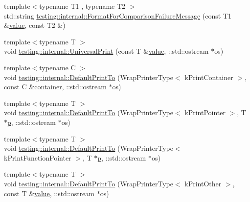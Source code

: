 \begin{DoxyCompactItemize}
\item 
{\footnotesize template$<$typename T1 , typename T2 $>$ }\\std\+::string \mbox{\hyperlink{namespacetesting_1_1internal_a91ab078f10adc669f09b7f604975c518}{testing\+::internal\+::\+Format\+For\+Comparison\+Failure\+Message}} (const T1 \&\mbox{\hyperlink{_obj__test_2lib_2googletest-master_2googlemock_2test_2gmock-matchers__test_8cc_a337b8a670efc0b086ad3af163f3121b6}{value}}, const T2 \&)
\item 
{\footnotesize template$<$typename T $>$ }\\void \mbox{\hyperlink{namespacetesting_1_1internal_a30708fa2bacf11895b03bdb21eb72309}{testing\+::internal\+::\+Universal\+Print}} (const T \&\mbox{\hyperlink{_obj__test_2lib_2googletest-master_2googlemock_2test_2gmock-matchers__test_8cc_a337b8a670efc0b086ad3af163f3121b6}{value}}, \+::std\+::ostream $\ast$os)
\item 
{\footnotesize template$<$typename C $>$ }\\void \mbox{\hyperlink{namespacetesting_1_1internal_a2e96c98d5bd8ee4a1b92f8e3cde7dd40}{testing\+::internal\+::\+Default\+Print\+To}} (Wrap\+Printer\+Type$<$ k\+Print\+Container $>$, const C \&container, \+::std\+::ostream $\ast$os)
\item 
{\footnotesize template$<$typename T $>$ }\\void \mbox{\hyperlink{namespacetesting_1_1internal_a074522dd8d77d61878a042b8d05cc64a}{testing\+::internal\+::\+Default\+Print\+To}} (Wrap\+Printer\+Type$<$ k\+Print\+Pointer $>$, T $\ast$\mbox{\hyperlink{_obj__test_2lib_2googletest-master_2googlemock_2test_2gmock-matchers__test_8cc_a6bc6b007533335efe02bafff799ec64c}{p}}, \+::std\+::ostream $\ast$os)
\item 
{\footnotesize template$<$typename T $>$ }\\void \mbox{\hyperlink{namespacetesting_1_1internal_a7729c07abcae6c69b9b370c39db61409}{testing\+::internal\+::\+Default\+Print\+To}} (Wrap\+Printer\+Type$<$ k\+Print\+Function\+Pointer $>$, T $\ast$\mbox{\hyperlink{_obj__test_2lib_2googletest-master_2googlemock_2test_2gmock-matchers__test_8cc_a6bc6b007533335efe02bafff799ec64c}{p}}, \+::std\+::ostream $\ast$os)
\item 
{\footnotesize template$<$typename T $>$ }\\void \mbox{\hyperlink{namespacetesting_1_1internal_a72b1a69d96be8ea6382539f5c4fcac6d}{testing\+::internal\+::\+Default\+Print\+To}} (Wrap\+Printer\+Type$<$ k\+Print\+Other $>$, const T \&\mbox{\hyperlink{_obj__test_2lib_2googletest-master_2googlemock_2test_2gmock-matchers__test_8cc_a337b8a670efc0b086ad3af163f3121b6}{value}}, \+::std\+::ostream $\ast$os)

\end{DoxyCompactItemize}
